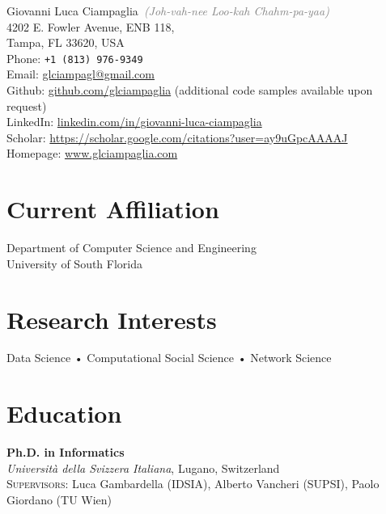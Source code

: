 \documentclass[10pt, letterpaper]{article}
\newcommand{\years}[1]{\marginnote{\small #1}}
\begin{document}
{\LARGE Giovanni Luca Ciampaglia}~\textcolor{gray}{\emph{(Joh-vah-nee Loo-kah Chahm-pa-yaa)}}\\[.75cm]
4202 E. Fowler Avenue, ENB 118, \\
Tampa, FL 33620, USA\\
Phone: \texttt{+1 (813) 976-9349}\\[.2cm]
Email: \href{mailto:gciampag@indiana.edu}{glciampagl@gmail.com}\\
Github: \href{http://github.com/glciampaglia}{github.com/glciampaglia} (additional code samples available upon request)\\ 
LinkedIn: \href{http://linkedin.com/in/giovanni-luca-ciampaglia}{linkedin.com/in/giovanni-luca-ciampaglia}\\
Scholar: \href{https://scholar.google.com/citations?user=ay9uGpcAAAAJ}{https://scholar.google.com/citations?user=ay9uGpcAAAAJ}\\
Homepage: \href{http://www.glciampaglia.com/}{www.glciampaglia.com}\\

\section*{Current Affiliation}

Department of Computer Science and Engineering\\
University of South Florida

\section*{Research Interests}
Data Science • Computational Social Science • Network Science


\section*{Education}
\noindent

\years{2012}\textbf{Ph.D. in Informatics}\\
%
\textsl{Università della Svizzera Italiana}, Lugano, Switzerland\\
%
\textsc{Supervisors}: Luca Gambardella (IDSIA), Alberto Vancheri (SUPSI), Paolo
Giordano (TU Wien)\\[1em]
\end{document}
